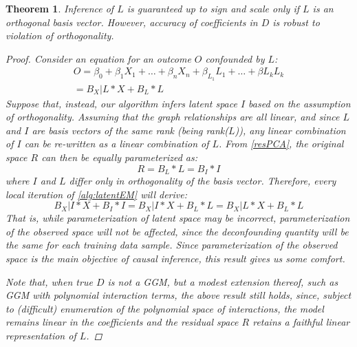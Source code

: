 \documentclass[letterpaper]{article}
\newtheorem{theorem}{Theorem}
\begin{document}
\begin{theorem}
\label{thm:deconfounding}
Inference of $L$ is guaranteed up to sign and scale only if $L$ is an orthogonal basis vector.  However, accuracy of coefficients in $D$ is robust to violation of orthogonality.
\begin{proof}
Consider an equation for an outcome $O$ confounded by $L$:
\begin{equation}
\begin{split}
O = \beta_{0} + \beta_{1} X_1 + \ldots +\beta_{n} X_n + \beta_{L_1} L_1 + \ldots + \beta{L_k} L_k \\= B_X|L * X + B_L * L
\end{split}
\label{eq:confNonOrth}
\end{equation}
Suppose that, instead, our algorithm infers latent space $I$ based on the assumption of orthogonality.  Assuming that the graph relationships are all linear, and since $L$ and $I$ are basis vectors of the same rank (being rank($L$)), any linear combination of $I$ can be re-written as a linear combination of $L$.  From \ref{resPCA}, the original space $R$ can then be equally parameterized as:
\begin{equation}
R = B_L * L = B_I * I
\end{equation}
where $I$ and $L$ differ only in orthogonality of the basis vector.   Therefore, every local iteration of \ref{alg:latentEM} will derive:
\begin{equation}
B_X|I * X + B_I * I = B_X|I * X  + B_L * L = B_X|L * X + B_L * L
\end{equation}
That is, while parameterization of latent space may be incorrect, parameterization of the observed space will not be affected, since the deconfounding quantity will be the same for each training data sample.  Since parameterization of the observed space is the main objective of causal inference, this result gives us some comfort.  

Note that, when true $D$ is not a GGM, but a modest extension thereof, such as GGM with polynomial interaction terms, the above result still holds, since, subject to (difficult) enumeration of the polynomial space of interactions, the model remains linear in the coefficients and the residual space $R$ retains a faithful linear representation of $L$.
\end{proof}
\end{theorem}
\end{document}
